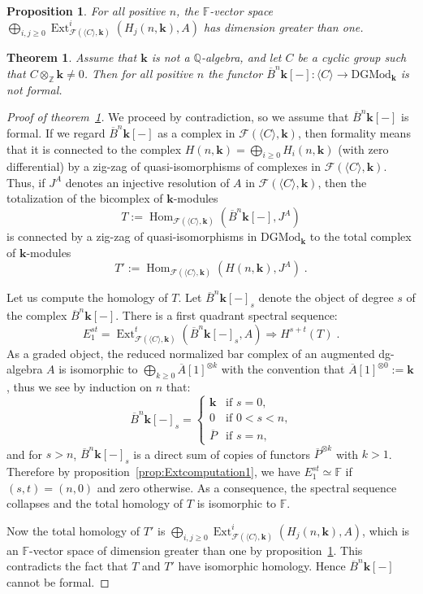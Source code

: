 \documentclass[10pt,a4paper]{amsart}
\newtheorem{theorem}{Theorem}
\newtheorem{proposition}{Proposition}
\DeclareMathOperator{\Ext}{Ext}
\newcommand{\F}{\mathbb F}
\DeclareMathOperator{\Hm}{Hom}
\newcommand{\Q}{\mathbb Q}
\newcommand{\Z}{\mathbb Z}
\renewcommand{\ge}{\geqslant}
\def\k{\mathbf{k}}
\begin{document}
\begin{proposition}\label{prop:Extcomputation2}
	For all positive $n$, the $\F$-vector space $\bigoplus_{i,j\ge 0}\Ext^i_{\mathcal{F}(\langle C\rangle,\k)}(H_j(n,\k),A)$ has dimension greater than one.
\end{proposition}

\begin{theorem}\label{thm:nonformality}
	Assume that $\k$ is not a $\Q$-algebra, and let $C$ be a cyclic group such that $C\otimes_{\Z}\k\ne 0$. Then for all positive $n$ the functor $\overline{B}^n\k[-]:\langle C\rangle\to \mathrm{DGMod}_\k$ is not formal.
\end{theorem}

\begin{proof}[Proof of theorem~\ref{thm:nonformality}]
	We proceed by contradiction, so we assume that $\overline{B}^n\k[-]$ is formal. If we regard $\overline{B}^n\k[-]$ as a complex in $\mathcal{F}(\langle C\rangle,\k)$, then formality means that it is connected to the complex $H(n,\k)=\bigoplus_{i\ge 0}H_i(n,\k)$ (with zero differential) by a zig-zag of quasi-isomorphisms of complexes in $\mathcal{F}(\langle C\rangle,\k)$. Thus, if $J^A$ denotes an injective resolution of $A$ in $\mathcal{F}(\langle C\rangle,\k)$, then the totalization of the bicomplex of $\k$-modules
	\[
		T:=\Hm_{\mathcal{F}(\langle C\rangle,\k)}(\overline{B}^n\k[-],J^A)
	\]
	is connected by a zig-zag of quasi-isomorphisms in $\mathrm{DGMod}_\k$ to the total complex of $\k$-modules
	\[
		T':=\Hm_{\mathcal{F}(\langle C\rangle,\k)}(H(n,\k),J^A)\;.
	\]
	
	Let us compute the homology of $T$. Let $\overline{B}^n\k[-]_s$ denote the object of degree $s$ of the complex  $\overline{B}^n\k[-]$. There is a first quadrant spectral sequence:
	\[
		E_1^{st}=\Ext^t_{\mathcal{F}(\langle C\rangle,\k)}(\overline{B}^n\k[-]_s,A)\Rightarrow H^{s+t}(T)\;.
	\]
	As a graded object, the reduced normalized bar complex of an augmented dg-algebra $A$ is isomorphic to $\bigoplus_{k\ge 0}\overline{A}[1]^{\otimes k}$ with the convention that $\overline{A}[1]^{\otimes 0}:=\k$, 
	thus we see by induction on $n$ that:
	\[ 
		\overline{B}^n\k[-]_s = 
		\begin{cases}
			\k & \text{if $s=0$,}\\
			0 & \text{if $0<s<n$,}\\
			\overline{P} & \text{if $s=n$,}
		\end{cases}
	\]
	and for $s>n$, $\overline{B}^n\k[-]_s$ is a direct sum of copies of functors $\overline{P}^{\otimes k}$ with $k>1$. Therefore by proposition~\ref{prop:Extcomputation1}, we have $E_1^{st}\simeq\F$ if $(s,t)=(n,0)$ and zero otherwise. As a consequence, the spectral sequence collapses and the total homology of $T$ is isomorphic to $\F$.
	
	Now the total homology of $T'$ is $\bigoplus_{i,j\ge 0}\Ext^i_{\mathcal{F}(\langle C\rangle,\k)}(H_j(n,\k),A)$, which is an $\F$-vector space of dimension greater than one by proposition~\ref{prop:Extcomputation2}. This contradicts the fact that $T$ and $T'$ have isomorphic homology. Hence $\overline{B}^n\k[-]$ cannot be formal.
\end{proof}
\end{document}
